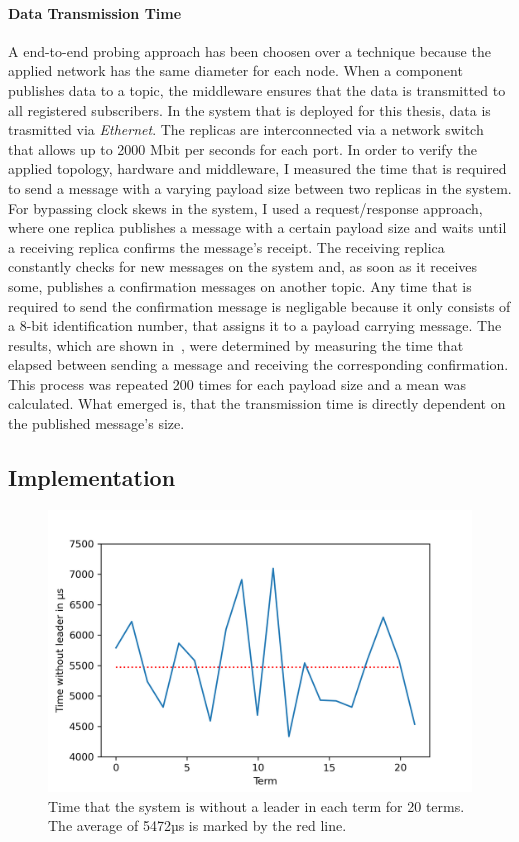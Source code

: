 \paragraph{Data Transmission Time}
A end-to-end probing approach has been choosen over a   technique because the applied network has the same diameter for each node.
When a component publishes data to a  topic, the middleware ensures that the data is transmitted to all registered subscribers.
In the system that is deployed for this thesis, data is trasmitted via \textit{Ethernet}.
The replicas are interconnected via a network switch that allows up to 2000 Mbit per seconds for each port.
In order to verify the applied topology, hardware and middleware, I measured the time that is required to send a message with a varying payload size between two replicas in the system.
For bypassing clock skews in the system, I used a request/response approach, where one replica publishes a message with a certain payload size and waits until a receiving replica confirms the message's receipt.
The receiving replica constantly checks for new messages on the system and, as soon as it receives some, publishes a confirmation messages on another topic.
Any time that is required to send the confirmation message is negligable because it only consists of a 8-bit identification number, that assigns it to a payload carrying message.
The results, which are shown in~\cite{fig:PlotSendingTimes}, were determined by measuring the time that elapsed between sending a message and receiving the corresponding confirmation.
This process was repeated 200 times for each payload size and a mean was calculated.
What emerged is, that the transmission time is directly dependent on the published message's size.

\subsection{Implementation}
\begin{figure}[!hb]
	\centering
	\includegraphics[width=0.75\linewidth]{images/plots/timeWithoutLeader}
	\caption{Time that the system is without a leader in each term for 20 terms. The average of 5472µs is marked by the red line.}
	\label{fig:PlotTimeWithoutLeader}
\end{figure}

